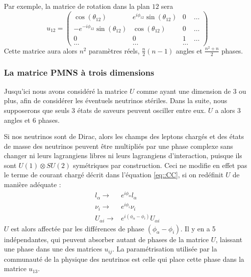             Par exemple, la matrice de rotation dans la plan $12$ sera
            \begin{equation}
                u_{12} = 
                \left(\begin{matrix}
                    \cos(\theta_{12}) & e^{i\phi_{12}}\sin(\theta_{12}) & 0 & ... \\
                    -e^{-i\phi_{12}}\sin(\theta_{12}) & \cos(\theta_{12}) & 0 & ... \\
                    0 & 0 & 1 & ... \\
                    ... & ... & ... &
                \end{matrix}\right)
            \end{equation}
            Cette matrice aura alors $n^2$ paramètres réels, $\frac{n}{2}(n-1)$ angles  et $\frac{n^2+n}{2}$ phases.
            
            \subsubsection{La matrice PMNS à trois dimensions}
            Jusqu'ici nous avons considéré la matrice $U$ comme ayant une dimension de 3 ou plus, afin de considérer les éventuels neutrinos stériles. Dans la suite, nous supposerons que seuls 3 états de saveurs peuvent osciller entre eux. $U$ a alors 3 angles et 6 phases.
            
            Si nos neutrinos sont de Dirac, alors les champs des leptons chargés et des états de masse des neutrinos peuvent être multipliés par une phase complexe sans changer ni leurs lagrangiens libres ni leurs lagrangiens d'interaction, puisque ils sont $U(1)\otimes SU(2)$ symétriques par construction. Ceci ne modifie en effet pas le terme de courant chargé décrit dans l'équation \eqref{eq::CC}, si on redéfinit $U$ de manière adéquate :
            \begin{eqnarray}
                l_{\alpha}\to & e^{i\phi_{\alpha}}l_{\alpha} \\
                \nu_{i}\to & e^{i\phi_i}\nu_{i} \\
                U_{\alpha i}\to & e^{i(\phi_{\alpha}-\phi_i)}U_{\alpha i}
            \end{eqnarray}
            $U$ est alors affectée par les différences de phase $(\phi_{\alpha}-\phi_i)$. Il y en a 5 indépendantes, qui peuvent absorber autant de phases de la matrice $U$, laissant une phase dans une des matrices $u_{ij}$. La paramétrisation utilisée par la communauté de la physique des neutrinos est celle qui place cette phase dans la matrice $u_{13}$.
            
